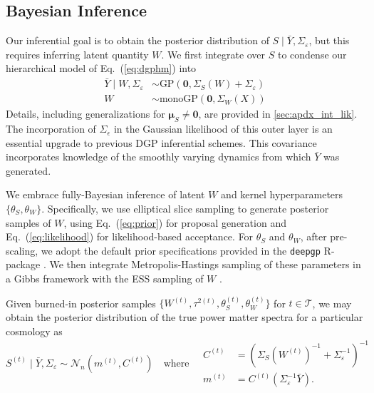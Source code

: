 \documentclass[11pt]{article}
\begin{document}
\subsection{Bayesian Inference}

Our inferential goal is to obtain the posterior distribution of 
$S\mid\bar{Y},\Sigma_\varepsilon$, but this requires inferring latent quantity $W$.  
We first integrate over $S$ to condense our hierarchical model of Eq.~(\ref{eq:dgphm}) into
\begin{align}
\label{eq:likelihood}
\bar{Y} \mid W, \Sigma_\varepsilon &\sim \textrm{GP}(\mathbf{0}, \Sigma_S(W) + \Sigma_\varepsilon) \\
\label{eq:prior}
W &\sim \mathrm{monoGP}\left(\mathbf{0}, \Sigma_W(X)\right)
\end{align}
Details, including generalizations for $\boldsymbol{\mu}_S\neq\mathbf{0}$, are provided in \ref{sec:apdx_int_lik}. 
The incorporation of $\Sigma_\epsilon$ in the
Gaussian likelihood of this outer layer is an essential upgrade to previous DGP inferential schemes.
This covariance incorporates knowledge of the smoothly varying dynamics from which $\bar{Y}$ was
generated.

We embrace fully-Bayesian inference of latent $W$ and kernel hyperparameters $\{\theta_S, \theta_W\}$.
Specifically, we use elliptical slice sampling \citep[ESS;][]{murray2010elliptical} to 
generate posterior samples of $W$, using Eq.~(\ref{eq:prior}) for proposal generation and 
Eq.~(\ref{eq:likelihood}) for likelihood-based acceptance.  
For $\theta_S$ and $\theta_W$, after pre-scaling, we adopt the default prior specifications 
provided in the {\tt deepgp} {\sf R}-package \citep{deepgp}.
We then integrate Metropolis-Hastings sampling of these parameters in a Gibbs framework 
with the ESS sampling of $W$ \citep{sauer2023active}.

Given burned-in posterior samples $\{W^{(t)}, \tau^{2(t)}, \theta_S^{(t)}, \theta_W^{(t)}\}$
for $t\in\mathcal{T}$, we may obtain the
posterior distribution of the true power matter spectra for a particular cosmology as
\[
S^{(t)}\mid\bar{Y}, \Sigma_\varepsilon \sim \mathcal{N}_n(m^{(t)}, C^{(t)})
\quad\textrm{where}\quad
\begin{array}{rl}
C^{(t)}&=\left(\Sigma_S(W^{(t)})^{-1}+\Sigma_\varepsilon^{-1}\right)^{-1} \\
m^{(t)}&=C^{(t)}\left(\Sigma_\varepsilon^{-1}\bar{Y}\right).
\end{array}
\] 
\end{document}
